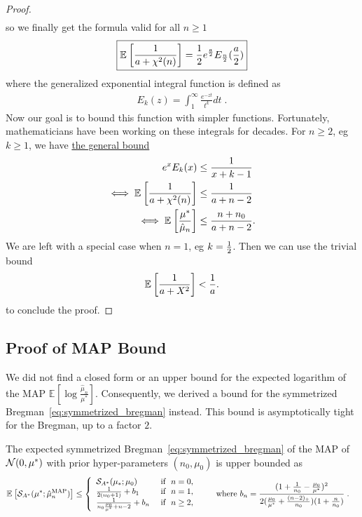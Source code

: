 \documentclass[twoside]{article}
\newcommand*{\expect}[2][]{\ensuremath{\mathbb{E}_{#1} \left[ #2 \right] }} %
\newcommand{\logpart}{A}
\newcommand{\conj}{{\logpart^*}}
\newcommand{\m}{\mu}
\newcommand{\MAPm}{\hat \m_n}
\begin{document}
\begin{proof}
\begin{align}
	\end{align}
	so we finally get  the formula valid for all $n\geq 1$
	\begin{align}
		\boxed{\expect{\inv{a + \chi^2(n)}}  = \half e^{\frac{a}{2}} E_{\half[n]}(\half[a])}
		\label{eq:hard_expectation}
	\end{align}
	where the {generalized exponential integral function} is defined as 
	\begin{align}
		E_k(z) = \int_1^\infty \frac{e^{-z t} }{t^k} dt \; .
	\end{align}
	Now our goal is to bound this function with simpler functions.
	Fortunately, mathematicians have been working on these integrals for decades.
	For $n \geq 2$, eg $k\geq 1$, we have \href{https://dlmf.nist.gov/8.19.E21}{the general bound} \citep[Eq.~8.19.21]{DLMF}
	\begin{align}
		e^x E_k(x) 
		&\leq \inv{x + k - 1} \\
		\iff \expect{\inv{a + \chi^2(n)}}
		&\leq \inv{a + n - 2} \\
		\iff \expect{\frac{\mu^*}{\MAPm}} 
		&\leq \frac{n +n_0}{a + n - 2}.
	\end{align}
We are left with a special case when  $n=1$, eg $k=\frac{1}{2}$. 
Then we can use the trivial bound 
\begin{align}
	\expect{\inv{a + X^2}} < \inv{a}.
	\label{eq:trivial_bound}
\end{align}
to conclude the proof.
\end{proof}



\subsection{Proof of MAP Bound}

We did not find a closed form or an upper bound for the expected logarithm of the MAP $\expect{\log\frac{\MAPm}{\mu^*}}$.
Consequently, we derived a bound for the symmetrized Bregman~\eqref{eq:symmetrized_bregman} instead. 
This bound is asymptotically tight for the Bregman, up to a factor $2$.

\begin{theorem}
The expected symmetrized Bregman~\eqref{eq:symmetrized_bregman} of the MAP of $\cN(0,\m^*)$ with prior hyper-parameters $(n_0,\m_0)$ is upper bounded as
 \begin{align}
	& \expect{\cS_\conj( \m^*; \hat \m_n^\mathrm{MAP})}
	\leq 
	\left\{\begin{array}{ll}
		\cS_\conj( \mu_*; \mu_0) 					& \text{ if } \ n=0, \\
		\inv{2(n_0+1)}  +  b_1 						& \text{ if }\ n=1,\\
		\frac{1}{n_0 \frac{\m_0}{\m^*} +n-2} + b_n  & \text{ if }\ n\geq 2,
	\end{array}\right.
	\quad 
	\quad 
	\text{where }
	b_n = \frac{(1 + \inv{n_0} - \frac{\m_0}{\m^*})^2}{2 (\frac{\m_0}{\m^*}+\frac{(n-2)_+}{n_0})(1 + \frac{n}{n_0} )} \; . 
\end{align}
\end{theorem} 
\end{document}
